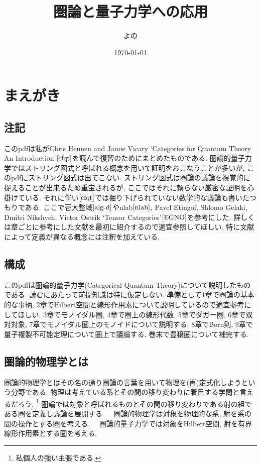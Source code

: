 \documentclass[a4paper,12pt]{ltjsarticle}
\title{圏論と量子力学への応用}
\author{よの}
\date{\today}
\theoremstyle{break}
\numberwithin{equation}{section}
\begin{document}
\maketitle

\newpage

\section*{まえがき}

\subsection*{注記}

このpdfは私がChris Heunen and Jamie Vicary `Categories for Quantum Theory An Introduction'$\cite{cfqt}$を読んで復習のためにまとめたものである. 
圏論的量子力学ではストリング図式と呼ばれる概念を用いて証明をおこなうことが多いが, このpdfにストリング図式は出てこない. 
ストリング図式は圏論の議論を視覚的に捉えることが出来るため重宝されるが, ここではそれに頼らない厳密な証明を心掛けている.  
それに伴い$\cite{cfqt}$では掘り下げられていない数学的な議論も書いたつもりである. 
ここで壱大整域$\cite{alg-d}$やnlab$\cite{nlab}$, Pavel Etingof, Shlomo Gelaki, Dmitri Nikshych, Victor Ostrik `Tensor Categories'$\cite{EGNO}$を参考にした. 
詳しくは章ごとに参考にした文献を最初に紹介するので適宜参照してほしい. 
特に文献によって定義が異なる概念には注釈を加えている. 

\subsection*{構成}

このpdfは圏論的量子力学(Categorical Quantum Theory)について説明したものである. 
読むにあたって前提知識は特に仮定しない. 
準備として1章で圏論の基本的な事柄, 2章でHilbert空間と線形作用素について説明しているので適宜参考にしてほしい.  
3章でモノイダル圏, 4章で圏上の線形代数, 5章でダガー圏, 6章で双対対象, 7章でモノイダル圏上のモノイドについて説明する. 
8章でBorn則, 9章で量子複製不可能定理について圏上で議論する. 
巻末で豊穣圏について補完する. 

\subsection*{圏論的物理学とは}

圏論的物理学とはその名の通り圏論の言葉を用いて物理を(再)定式化しようという分野である. 
物理は考えている系とその間の移り変わりに着目する学問と言えるだろう.
\footnote{
  私個人の強い主張である. 
}
圏論では対象と呼ばれるものとその間の移り変わりである射の組である圏を定義し議論を展開する.　
圏論的物理学は対象を物理的な系, 射を系の間の操作とする圏を考える.　
圏論的量子力学では対象をHilbert空間, 射を有界線形作用素とする圏を考える. 
\end{document}
